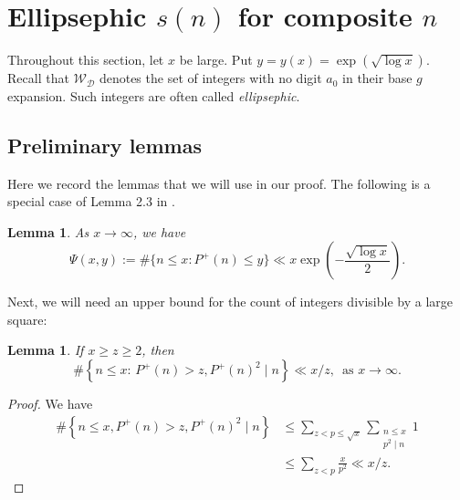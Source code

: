 \documentclass[11pt, reqno]{amsart}
\newtheorem{lemma}[theorem]{Lemma}
\theoremstyle{remark}
\numberwithin{theorem}{section}
\numberwithin{proposition}{section}
\numberwithin{lemma}{section}
\numberwithin{corollary}{section}
\numberwithin{equation}{section}
\numberwithin{conjecture}{section}
\numberwithin{definition}{section}
\begin{document}
\section{Ellipsephic $s(n)$ for composite $n$}
Throughout this section, let $x$ be large. Put 
	$y=y(x)=\exp (\sqrt{\log x})$. Recall that $\mathcal{W}_{\mathcal{D}}$ denotes the set of integers with no digit $a_0$ in their base $g$ expansion. Such integers are often called \emph{ellipsephic}.

\subsection{Preliminary lemmas}

Here we record the lemmas that we will use in our proof. The following is a special case of Lemma 2.3 in \cite{Pollack2014}.
 
 
 
	\begin{lemma}\label{Lemma 1-g} As $x\to\infty$, we have
	$$
	\Psi (x , y):=\#\{n \leqslant x: P^+(n) \leqslant y\} \ll x \exp \left(-\frac{\sqrt{\log x}}{2}\right).
	$$
	\end{lemma}
	
Next, we will need an upper bound for the count of integers divisible by a large square:
    
    \begin{lemma}\label{Lemma 2-g}
   If $x\geq z\geq 2$, then 
$$\#\left\{n \leqslant x:\, P^{+}(n)>z, P^{+}(n)^{2} \mid n\right\} \ll x/z, \,\text{ as }x\to\infty. $$
\end{lemma}
	\begin{proof} We have 
$$
\begin{aligned}
	\#\left\{n \leqslant x, P^{+}(n)>z, P^{+}(n)^{2} \mid n\right\} & \leqslant \sum_{z<p \leqslant \sqrt{x}} \sum_{\substack{n \leqslant x\\ p^2\mid n}} 1 \\
	& \leqslant \sum_{z<p} \frac{x}{p^{2}}\ll x/z.
\end{aligned}
$$
\end{proof} 
	
\end{document}
